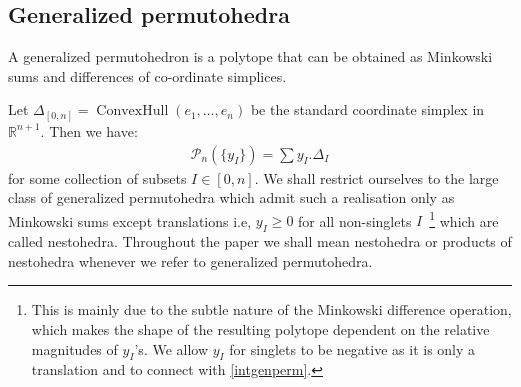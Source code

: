 \documentclass[hidelinks,12pt]{article}
\newcommand{\bea}[1]{\begin{eqnarray}\label{#1} }
\newcommand{\eea}{\end{eqnarray}}
\def\bea{\begin{eqnarray}}
\def\eea{\end{eqnarray}}
\begin{document}
\subsection{Generalized permutohedra}\label{GP}
A generalized permutohedron is a polytope that can be obtained as Minkowski sums and differences of co-ordinate simplices. 

Let $\Delta_{[0,n]} = \operatorname{ConvexHull}(e_1,\dots,e_n)$ be the standard coordinate simplex in $\mathbb{R}^{n+1}$. Then we have:
\bea
{\mathscr P_n}(\{y_I \})= \sum y_I . \Delta_I  
\eea
for some collection of subsets $I \in [0,n]$.
We shall restrict ourselves to the large class of generalized permutohedra which admit such a realisation only as Minkowski sums except translations i.e, $y_I \ge 0$ for all non-singlets $I$~\footnote{This is mainly due to the subtle nature of the Minkowski difference operation, which makes the shape of the resulting polytope dependent on the relative magnitudes of $y_I$'s. We allow $y_I$ for singlets to be  negative as it is only a translation and to connect with \eqref{intgenperm}.} which are called nestohedra. Throughout the paper we shall mean nestohedra or products of nestohedra whenever we refer to generalized permutohedra.
\end{document}
